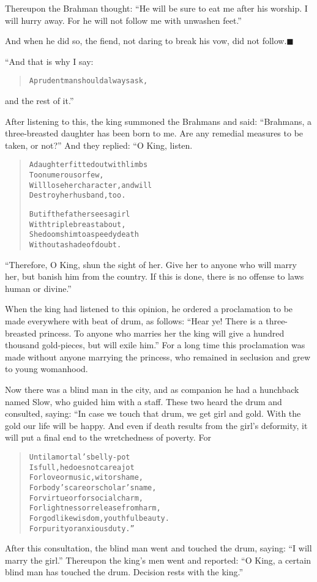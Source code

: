 \documentclass[article, twoside, 14pt]{memoir}
\newcommand{\qed}{\hfill \ensuremath{\blacksquare}}
\renewenvironment{verbatim}{%
\begin{quote}%
\vskip -10pt%
\begin{alltt}\normalfont\large}{\end{alltt}%
\end{quote}%
\vskip -10pt
} %
\begin{document}
Thereupon the Brahman thought:
``He will be sure to eat me after his worship. I will hurry away. For he will not follow me with unwashen feet.''

And when he did so, the fiend, not daring to break his vow, did not
follow.\hyperref[s90]{\qed}

“And that is why I say:

\begin{verbatim}
A prudent man should always ask,
\end{verbatim}
and the rest of it.”

After listening to this, the king summoned the Brahmans and said:
``Brahmans, a three-breasted daughter has been born to me. Are any remedial measures to be taken, or not?''
And they replied: “O King, listen.

\begin{verbatim}
A daughter fitted out with limbs
    Too numerous or few,
Will lose her character, and will
    Destroy her husband, too.

But if the father sees a girl
    With triple breast about,
She dooms him to a speedy death
    Without a shade of doubt.
\end{verbatim}
``Therefore, O King, shun the sight of her. Give her to anyone who will marry her, but banish him from the country. If this is done, there is no offense to laws human or divine.''

When the king had listened to this opinion, he ordered a
proclamation to be made everywhere with beat of drum, as follows:
``Hear ye! There is a three-breasted princess. To anyone who marries her the king will give a hundred thousand gold-pieces, but will exile him.''
For a long time this proclamation was made without anyone marrying
the princess, who remained in seclusion and grew to young
womanhood.

Now there was a blind man in the city, and as companion he
had a hunchback named Slow, who guided him with a staff. These two
heard the drum and consulted, saying: “In case we touch that drum,
we get girl and gold. With the gold our life will be happy. And
even if death results from the girl's deformity, it will put a
final end to the wretchedness of poverty. For

\begin{verbatim}
Until a mortal's belly-pot
Is full, he does not care a jot
For love or music, wit or shame,
For body's care or scholar's name,
For virtue or for social charm,
For lightness or release from harm,
For godlike wisdom, youthful beauty.
For purity or anxious duty.”
\end{verbatim}
After this consultation, the blind man went and touched the drum,
saying: ``I will marry the girl.'' Thereupon the king's men went
and reported:
``O King, a certain blind man has touched the drum. Decision rests with the king.''
\end{document}
